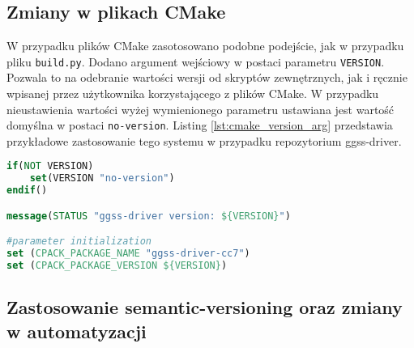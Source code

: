 \subsection{Zmiany w plikach CMake}

W przypadku plików CMake zasotosowano podobne podejście, jak w przypadku pliku \lstinline{build.py}. Dodano argument wejściowy w postaci parametru \lstinline{VERSION}. Pozwala to na odebranie wartości wersji od skryptów zewnętrznych, jak i ręcznie wpisanej przez użytkownika korzystającego z plików CMake. W przypadku nieustawienia wartości wyżej wymienionego parametru ustawiana jest wartość domyślna w postaci \lstinline{no-version}. Listing \ref{lst:cmake_version_arg} przedstawia przykładowe zastosowanie tego systemu w przypadku repozytorium ggss-driver.

\begin{lstlisting}[language=CMake,caption={Zastosowanie parametru VERSION w repozytorium ggss-driver},label={lst:cmake_version_arg},frame=single]
if(NOT VERSION)
    set(VERSION "no-version")
endif()

message(STATUS "ggss-driver version: ${VERSION}")

#parameter initialization
set (CPACK_PACKAGE_NAME "ggss-driver-cc7")
set (CPACK_PACKAGE_VERSION ${VERSION})
\end{lstlisting}


\subsection{Zastosowanie semantic-versioning oraz zmiany w automatyzacji}

